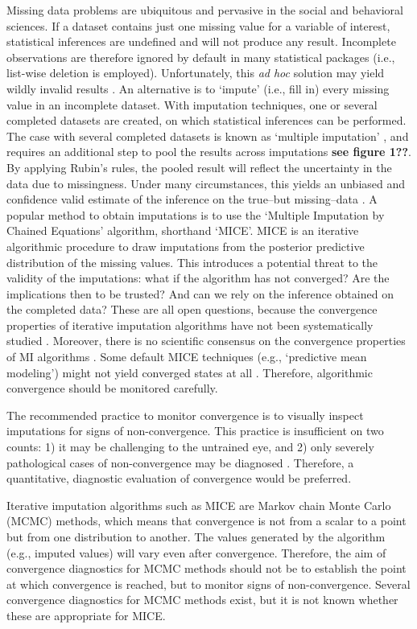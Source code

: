 \documentclass[Royal,times,sageh]{sagej}
\begin{document}
Missing data problems are ubiquitous and pervasive in the social and
behavioral sciences. If a dataset contains just one missing value for a
variable of interest, statistical inferences are undefined and will not
produce any result. Incomplete observations are therefore ignored by
default in many statistical packages (i.e., list-wise deletion is
employed). Unfortunately, this \emph{ad hoc} solution may yield wildly
invalid results \citep{buur18}. An alternative is to `impute' (i.e.,
fill in) every missing value in an incomplete dataset. With imputation
techniques, one or several completed datasets are created, on which
statistical inferences can be performed. The case with several completed
datasets is known as `multiple imputation' \citep[MI;][]{rubin76}, and
requires an additional step to pool the results across imputations
\textbf{see figure 1??}. By applying Rubin's rules, the pooled result
will reflect the uncertainty in the data due to missingness. Under many
circumstances, this yields an unbiased and confidence valid estimate of
the inference on the true--but missing--data \citep{buur18}. A popular
method to obtain imputations is to use the `Multiple Imputation by
Chained Equations' algorithm, shorthand `MICE'\citep{mice}. MICE is an
iterative algorithmic procedure to draw imputations from the posterior
predictive distribution of the missing values. This introduces a
potential threat to the validity of the imputations: what if the
algorithm has not converged? Are the implications then to be trusted?
And can we rely on the inference obtained on the completed data? These
are all open questions, because the convergence properties of iterative
imputation algorithms have not been systematically studied
\citep{buur18}. Moreover, there is no scientific consensus on the
convergence properties of MI algorithms \citep{taka17}. Some default
MICE techniques (e.g., `predictive mean modeling') might not yield
converged states at all \citep{murr18}. Therefore, algorithmic
convergence should be monitored carefully.

The recommended practice to monitor convergence is to visually inspect
imputations for signs of non-convergence. This practice is insufficient
on two counts: 1) it may be challenging to the untrained eye, and 2)
only severely pathological cases of non-convergence may be diagnosed
\citep[\(\S\) 6.5.2]{buur18}. Therefore, a quantitative, diagnostic
evaluation of convergence would be preferred.

Iterative imputation algorithms such as MICE are Markov chain Monte
Carlo (MCMC) methods, which means that convergence is not from a scalar
to a point but from one distribution to another. The values generated by
the algorithm (e.g., imputed values) will vary even after convergence.
Therefore, the aim of convergence diagnostics for MCMC methods should
not be to establish the point at which convergence is reached, but to
monitor signs of non-convergence. Several convergence diagnostics for
MCMC methods exist, but it is not known whether these are appropriate
for MICE.
\end{document}
